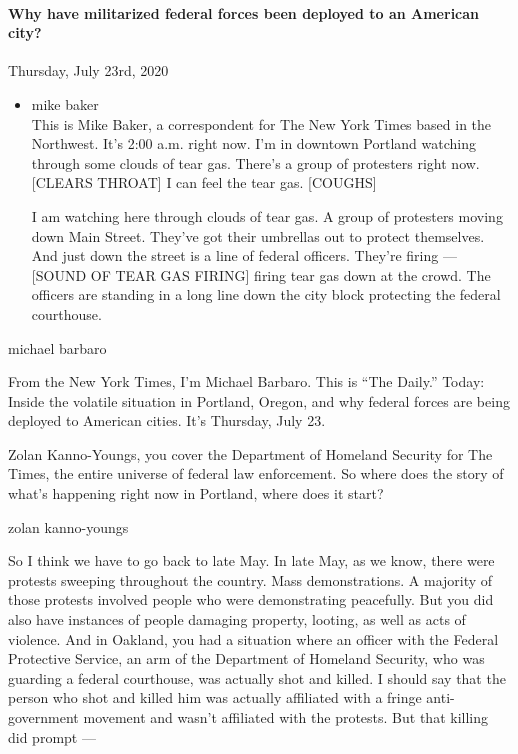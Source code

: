 \hypertarget{why-have-militarized-federal-forces-been-deployed-to-an-american-city-2}{%
\paragraph{Why have militarized federal forces been deployed to an
American
city?}\label{why-have-militarized-federal-forces-been-deployed-to-an-american-city-2}}

Thursday, July 23rd, 2020

\begin{itemize}
\item
  mike baker\\
  This is Mike Baker, a correspondent for The New York Times based in
  the Northwest. It's 2:00 a.m. right now. I'm in downtown Portland
  watching through some clouds of tear gas. There's a group of
  protesters right now. {[}CLEARS THROAT{]} I can feel the tear gas.
  {[}COUGHS{]}

  I am watching here through clouds of tear gas. A group of protesters
  moving down Main Street. They've got their umbrellas out to protect
  themselves. And just down the street is a line of federal officers.
  They're firing --- {[}SOUND OF TEAR GAS FIRING{]} firing tear gas down
  at the crowd. The officers are standing in a long line down the city
  block protecting the federal courthouse.
\end{itemize}

michael barbaro

From the New York Times, I'm Michael Barbaro. This is ``The Daily.''
Today: Inside the volatile situation in Portland, Oregon, and why
federal forces are being deployed to American cities. It's Thursday,
July 23.

Zolan Kanno-Youngs, you cover the Department of Homeland Security for
The Times, the entire universe of federal law enforcement. So where does
the story of what's happening right now in Portland, where does it
start?

zolan kanno-youngs

So I think we have to go back to late May. In late May, as we know,
there were protests sweeping throughout the country. Mass
demonstrations. A majority of those protests involved people who were
demonstrating peacefully. But you did also have instances of people
damaging property, looting, as well as acts of violence. And in Oakland,
you had a situation where an officer with the Federal Protective
Service, an arm of the Department of Homeland Security, who was guarding
a federal courthouse, was actually shot and killed. I should say that
the person who shot and killed him was actually affiliated with a fringe
anti-government movement and wasn't affiliated with the protests. But
that killing did prompt ---

